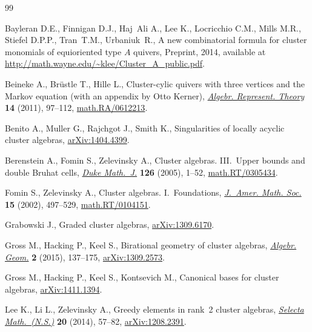 \documentclass[pdftex]{sigma}
\numberwithin{equation}{section}
\begin{document}
\begin{thebibliography}{99}
\footnotesize\itemsep=0pt

Bayleran D.E., Finnigan D.J., Haj~Ali A., Lee K., Locricchio C.M., Mills M.R.,
  Stiefel D.P.P., Tran~T.M., Urbaniuk~R., A new combinatorial formula for
  cluster monomials of equioriented type $A$ quivers, {P}reprint, 2014,
  available at \url{http://math.wayne.edu/~klee/Cluster_A_public.pdf}.

Beineke A., Br{\"u}stle T., Hille L., Cluster-cylic quivers with three vertices
  and the {M}arkov equation (with an appendix by Otto Kerner), \href{http://dx.doi.org/10.1007/s10468-009-9179-9}{\textit{Algebr.
  Represent. Theory}} \textbf{14} (2011), 97--112, \href{http://arxiv.org/abs/math.RA/0612213}{math.RA/0612213}.

Benito A., Muller G., Rajchgot J., Smith K., Singularities of locally acyclic
  cluster algebras, \href{http://arxiv.org/abs/1404.4399}{arXiv:1404.4399}.

Berenstein A., Fomin S., Zelevinsky A., Cluster algebras. {III}.~{U}pper bounds
  and double {B}ruhat cells, \href{http://dx.doi.org/10.1215/S0012-7094-04-12611-9}{\textit{Duke Math.~J.}} \textbf{126} (2005), 1--52,
  \href{http://arxiv.org/abs/math.RT/0305434}{math.RT/0305434}.

Fomin S., Zelevinsky A., Cluster algebras. {I}.~{F}oundations, \href{http://dx.doi.org/10.1090/S0894-0347-01-00385-X}{\textit{J.~Amer.
  Math. Soc.}} \textbf{15} (2002), 497--529, \href{http://arxiv.org/abs/math.RT/0104151}{math.RT/0104151}.

Grabowski J., Graded cluster algebras, \href{http://arxiv.org/abs/1309.6170}{arXiv:1309.6170}.

Gross M., Hacking P., Keel S., Birational geometry of cluster algebras,
  \href{http://dx.doi.org/10.14231/AG-2015-007}{\textit{Algebr. Geom.}} \textbf{2} (2015), 137--175, \href{http://arxiv.org/abs/1309.2573}{arXiv:1309.2573}.

Gross M., Hacking P., Keel S., Kontsevich M., Canonical bases for cluster
  algebras, \href{http://arxiv.org/abs/1411.1394}{arXiv:1411.1394}.

Lee K., Li L., Zelevinsky A., Greedy elements in rank~2 cluster algebras,
  \href{http://dx.doi.org/10.1007/s00029-012-0115-1}{\textit{Selecta Math.~(N.S.)}} \textbf{20} (2014), 57--82, \href{http://arxiv.org/abs/1208.2391}{arXiv:1208.2391}.


\end{thebibliography}
\end{document}
